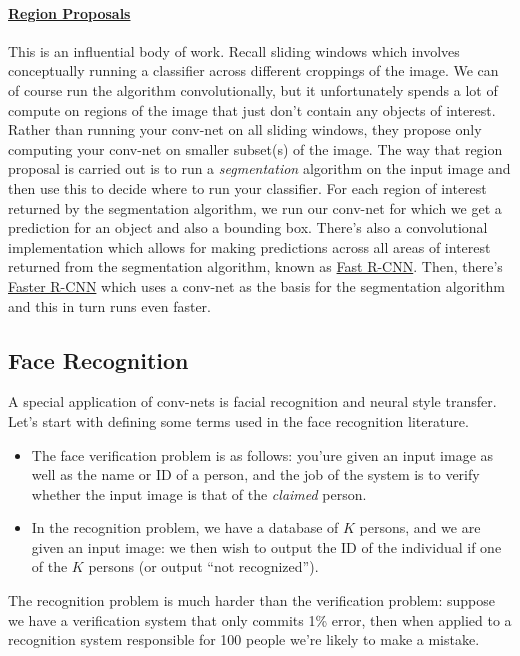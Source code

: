 \documentclass[12pt]{article}
\begin{document}
\paragraph{\href{https://arxiv.org/abs/1311.2524}{Region Proposals}} This is an influential body of work. Recall sliding windows which involves conceptually running a classifier across different croppings of the image. We can of course run the algorithm convolutionally, but it unfortunately spends a lot of compute on regions of the image that just don't contain any objects of interest. 
Rather than running your conv-net on all sliding windows, they propose only computing your conv-net on smaller subset(s) of the image. The way that region proposal is carried out is to run a \emph{segmentation} algorithm on the input image and then use this to decide where to run your classifier. For each region of interest returned by the segmentation algorithm, we run our conv-net for which we get a prediction for an object and also a bounding box. There's also
a convolutional implementation which allows for making predictions across all areas of interest returned from the segmentation algorithm, known as \href{https://arxiv.org/abs/1504.08083}{Fast R-CNN}. Then, there's \href{https://arxiv.org/abs/1506.01497}{Faster R-CNN} which uses a conv-net as the basis for the segmentation algorithm and this in turn runs even faster.

\subsection{Face Recognition} A special application of conv-nets is facial recognition and neural style transfer. Let's start with defining some terms used in the face recognition literature.
\begin{itemize}
  \item The face verification problem is as follows: you'ure given an input image as well as the name or ID of a person, and the job of the system is to verify whether the input image is that of the \emph{claimed} person.
\item In the recognition problem, we have a database of $K$ persons, and we are given an input image: we then wish to output the ID of the individual if one of the $K$ persons (or output ``not recognized'').
\end{itemize}
The recognition problem is much harder than the verification problem: suppose we have a verification system that only commits 1\% error, then when applied to a recognition system responsible for 100 people we're likely to make a mistake.
\end{document}
